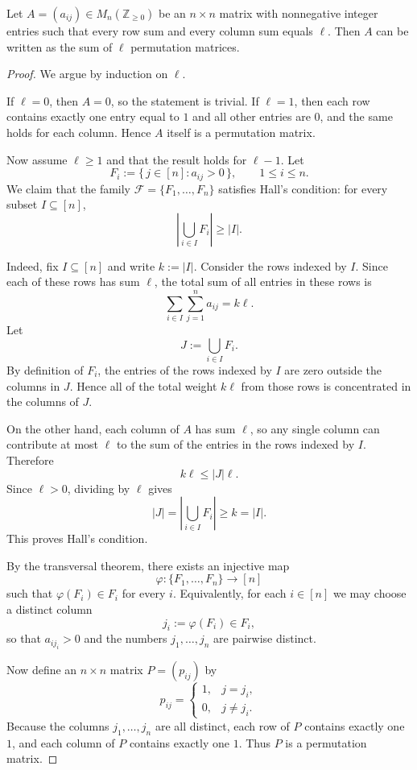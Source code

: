 \documentclass[11pt, a4paper]{ctexrep}
\begin{document}
\begin{theorem}[Birkhoff, 1946]
    Let $A=(a_{ij})\in M_n(\mathbb{Z}_{\ge 0})$ be an $n\times n$ matrix with nonnegative
    integer entries such that every row sum and every column sum equals $\ell$.
    Then $A$ can be written as the sum of $\ell$ permutation matrices.
\end{theorem}

\begin{proof}
    We argue by induction on $\ell$.

    If $\ell=0$, then $A=0$, so the statement is trivial.
    If $\ell=1$, then each row contains exactly one entry equal to $1$ and all other
    entries are $0$, and the same holds for each column. Hence $A$ itself is a
    permutation matrix.

    Now assume $\ell\ge 1$ and that the result holds for $\ell-1$.
    Let
    \[
        F_i:=\{\,j\in [n]: a_{ij}>0\,\},\qquad 1\le i\le n.
    \]
    We claim that the family $\mathcal F=\{F_1,\dots,F_n\}$ satisfies Hall's condition:
    for every subset $I\subseteq [n]$,
    \[
        \left|\bigcup_{i\in I}F_i\right|\ge |I|.
    \]

    Indeed, fix $I\subseteq [n]$ and write $k:=|I|$.
    Consider the rows indexed by $I$.
    Since each of these rows has sum $\ell$, the total sum of all entries in these rows is
    \[
        \sum_{i\in I}\sum_{j=1}^n a_{ij}=k\ell.
    \]
    Let
    \[
        J:=\bigcup_{i\in I}F_i.
    \]
    By definition of $F_i$, the entries of the rows indexed by $I$ are zero outside the
    columns in $J$. Hence all of the total weight $k\ell$ from those rows is concentrated
    in the columns of $J$.

    On the other hand, each column of $A$ has sum $\ell$, so any single column can
    contribute at most $\ell$ to the sum of the entries in the rows indexed by $I$.
    Therefore
    \[
        k\ell \le |J|\ell.
    \]
    Since $\ell>0$, dividing by $\ell$ gives
    \[
        |J|=\left|\bigcup_{i\in I}F_i\right|\ge k=|I|.
    \]
    This proves Hall's condition.

    By the transversal theorem, there exists an injective map
    \[
        \varphi:\{F_1,\dots,F_n\}\to [n]
    \]
    such that $\varphi(F_i)\in F_i$ for every $i$.
    Equivalently, for each $i\in [n]$ we may choose a distinct column
    \[
        j_i:=\varphi(F_i)\in F_i,
    \]
    so that $a_{i j_i}>0$ and the numbers $j_1,\dots,j_n$ are pairwise distinct.

    Now define an $n\times n$ matrix $P=(p_{ij})$ by
    \[
        p_{ij}=
        \begin{cases}
            1, & j=j_i,    \\
            0, & j\ne j_i.
        \end{cases}
    \]
    Because the columns $j_1,\dots,j_n$ are all distinct, each row of $P$ contains exactly
    one $1$, and each column of $P$ contains exactly one $1$. Thus $P$ is a permutation
    matrix.


\end{proof}
\end{document}
